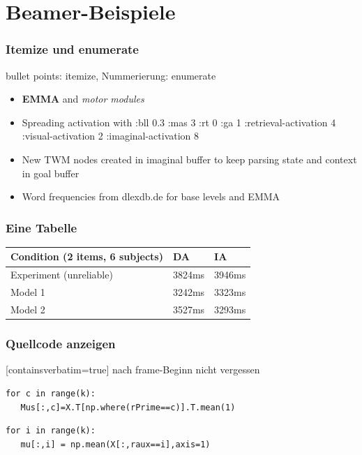 \section{Beamer-Beispiele}

\begin{frame}
\frametitle{Itemize und enumerate}
bullet points: itemize, Nummerierung: enumerate
\begin{itemize}
\item \textbf{EMMA} and \emph{motor modules}
\item Spreading activation with :bll 0.3 :mas 3 :rt 0 :ga 1
    :retrieval-activation 4 :visual-activation 2 :imaginal-activation 8
\item New TWM nodes created in imaginal buffer to keep parsing state
    and context in goal buffer
\item Word frequencies from dlexdb.de for base levels and EMMA
\end{itemize}
\end{frame}

\begin{frame}
\frametitle{Eine Tabelle}
\begin{table}[h]
\begin{center}
\begin{tabularx}{9cm}{Xll}
\toprule
Condition (2 items, 6 subjects) & DA & IA \\\midrule
Experiment (unreliable) & 3824ms & 3946ms \\
Model 1 & 3242ms & 3323ms \\
Model 2 & 3527ms & 3293ms \\
\bottomrule%
\end{tabularx}%
\end{center}%
\end{table}
\end{frame}

\begin{frame}[containsverbatim=true]
\frametitle{Quellcode anzeigen}
[containsverbatim=true] nach frame-Beginn nicht vergessen

\vskip 20pt

\begin{lstlisting}
for c in range(k):
   Mus[:,c]=X.T[np.where(rPrime==c)].T.mean(1)
\end{lstlisting}
\begin{lstlisting}
for i in range(k):
   mu[:,i] = np.mean(X[:,raux==i],axis=1)
\end{lstlisting}
\end{frame}

